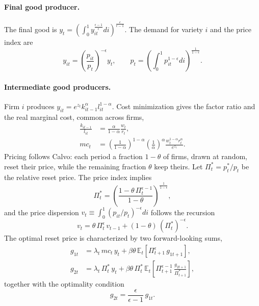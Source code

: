 \documentclass[11pt]{article}
\begin{document}
\paragraph{Final good producer.} The final good is $y_t = \left( \int_0^1 y_{it}^{\frac{\epsilon-1}{\epsilon}} di \right)^{\frac{\epsilon}{\epsilon-1}}$. The demand for variety $i$ and the price index are
\begin{equation}
y_{it} = \left( \frac{p_{it}}{p_t} \right)^{-\epsilon} y_t, \qquad
p_t = \left( \int_0^1 p_{it}^{1-\epsilon} di \right)^{\frac{1}{1-\epsilon}} .
\end{equation}

\paragraph{Intermediate good producers.} Firm $i$ produces $y_{it} = e^{z_t} k_{it-1}^{\alpha} l_{it}^{1-\alpha}$. Cost minimization gives the factor ratio and the real marginal cost, common across firms,
\begin{align}
\frac{k_{it-1}}{l_{it}} &= \frac{\alpha}{1-\alpha} \frac{w_t}{r_t}, \\
mc_t &= \left( \frac{1}{1-\alpha} \right)^{1-\alpha} \left( \frac{1}{\alpha} \right)^{\alpha} \frac{w_t^{1-\alpha} r_t^{\alpha}}{e^{z_t}} .
\end{align}
Pricing follows Calvo: each period a fraction $1-\theta$ of firms, drawn at random, reset their price, while the remaining fraction $\theta$ keep theirs. Let $\Pi_t^{*} = p_t^{*}/p_t$ be the relative reset price. The price index implies
\begin{equation}
\Pi_t^{*} = \left( \frac{1 - \theta\, \Pi_t^{\epsilon-1}}{1-\theta} \right)^{\frac{1}{1-\epsilon}} ,
\end{equation}
and the price dispersion $v_t \equiv \int_0^1 (p_{it}/p_t)^{-\epsilon} di$ follows the recursion
\begin{equation}
v_t = \theta\, \Pi_t^{\epsilon}\, v_{t-1} + (1-\theta)\, (\Pi_t^{*})^{-\epsilon} .
\end{equation}
The optimal reset price is characterized by two forward-looking sums,
\begin{align}
g_{1t} &= \lambda_t\, mc_t\, y_t + \beta\theta\, \mathbb{E}_t \left[ \Pi_{t+1}^{\epsilon}\, g_{1t+1} \right], \\
g_{2t} &= \lambda_t\, \Pi_t^{*}\, y_t + \beta\theta\, \Pi_t^{*}\, \mathbb{E}_t \left[ \Pi_{t+1}^{\epsilon-1}\, \frac{g_{2t+1}}{\Pi_{t+1}^{*}} \right],
\end{align}
together with the optimality condition
\begin{equation}
g_{2t} = \frac{\epsilon}{\epsilon-1}\, g_{1t} .
\end{equation}
\end{document}
